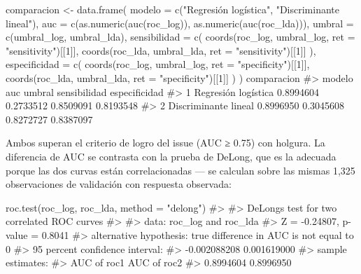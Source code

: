 \documentclass[
  spanish,
  letterpaper,
  DIV=11,
  numbers=noendperiod]{scrartcl}
\newenvironment{Shaded}{\begin{snugshade}}{\end{snugshade}}
\newcommand{\AttributeTok}[1]{\textcolor[rgb]{0.40,0.45,0.13}{#1}}
\newcommand{\CommentTok}[1]{\textcolor[rgb]{0.37,0.37,0.37}{#1}}
\newcommand{\DecValTok}[1]{\textcolor[rgb]{0.68,0.00,0.00}{#1}}
\newcommand{\FunctionTok}[1]{\textcolor[rgb]{0.28,0.35,0.67}{#1}}
\newcommand{\NormalTok}[1]{\textcolor[rgb]{0.00,0.23,0.31}{#1}}
\newcommand{\OtherTok}[1]{\textcolor[rgb]{0.00,0.23,0.31}{#1}}
\newcommand{\StringTok}[1]{\textcolor[rgb]{0.13,0.47,0.30}{#1}}
\begin{document}
\begin{Shaded}
\begin{Highlighting}[]
\NormalTok{comparacion }\OtherTok{\textless{}{-}} \FunctionTok{data.frame}\NormalTok{(}
    \AttributeTok{modelo =} \FunctionTok{c}\NormalTok{(}\StringTok{"Regresión logística"}\NormalTok{, }\StringTok{"Discriminante lineal"}\NormalTok{),}
    \AttributeTok{auc =} \FunctionTok{c}\NormalTok{(}\FunctionTok{as.numeric}\NormalTok{(}\FunctionTok{auc}\NormalTok{(roc\_log)), }\FunctionTok{as.numeric}\NormalTok{(}\FunctionTok{auc}\NormalTok{(roc\_lda))),}
    \AttributeTok{umbral =} \FunctionTok{c}\NormalTok{(umbral\_log, umbral\_lda),}
    \AttributeTok{sensibilidad =} \FunctionTok{c}\NormalTok{(}
        \FunctionTok{coords}\NormalTok{(roc\_log, umbral\_log, }\AttributeTok{ret =} \StringTok{"sensitivity"}\NormalTok{)[[}\DecValTok{1}\NormalTok{]],}
        \FunctionTok{coords}\NormalTok{(roc\_lda, umbral\_lda, }\AttributeTok{ret =} \StringTok{"sensitivity"}\NormalTok{)[[}\DecValTok{1}\NormalTok{]]}
\NormalTok{    ),}
    \AttributeTok{especificidad =} \FunctionTok{c}\NormalTok{(}
        \FunctionTok{coords}\NormalTok{(roc\_log, umbral\_log, }\AttributeTok{ret =} \StringTok{"specificity"}\NormalTok{)[[}\DecValTok{1}\NormalTok{]],}
        \FunctionTok{coords}\NormalTok{(roc\_lda, umbral\_lda, }\AttributeTok{ret =} \StringTok{"specificity"}\NormalTok{)[[}\DecValTok{1}\NormalTok{]]}
\NormalTok{    )}
\NormalTok{)}
\NormalTok{comparacion}
\CommentTok{\#\textgreater{}                 modelo       auc    umbral sensibilidad especificidad}
\CommentTok{\#\textgreater{} 1  Regresión logística 0.8994604 0.2733512    0.8509091     0.8193548}
\CommentTok{\#\textgreater{} 2 Discriminante lineal 0.8996950 0.3045608    0.8272727     0.8387097}
\end{Highlighting}
\end{Shaded}

Ambos superan el criterio de logro del issue (AUC ≥ 0.75) con holgura.
La diferencia de AUC se contrasta con la prueba de DeLong, que es la
adecuada porque las dos curvas están correlacionadas --- se calculan
sobre las mismas 1,325 observaciones de validación con respuesta
observada:

\begin{Shaded}
\begin{Highlighting}[]
\FunctionTok{roc.test}\NormalTok{(roc\_log, roc\_lda, }\AttributeTok{method =} \StringTok{"delong"}\NormalTok{)}
\CommentTok{\#\textgreater{} }
\CommentTok{\#\textgreater{}  DeLong\textquotesingle{}s test for two correlated ROC curves}
\CommentTok{\#\textgreater{} }
\CommentTok{\#\textgreater{} data:  roc\_log and roc\_lda}
\CommentTok{\#\textgreater{} Z = {-}0.24807, p{-}value = 0.8041}
\CommentTok{\#\textgreater{} alternative hypothesis: true difference in AUC is not equal to 0}
\CommentTok{\#\textgreater{} 95 percent confidence interval:}
\CommentTok{\#\textgreater{}  {-}0.002088208  0.001619000}
\CommentTok{\#\textgreater{} sample estimates:}
\CommentTok{\#\textgreater{} AUC of roc1 AUC of roc2 }
\CommentTok{\#\textgreater{}   0.8994604   0.8996950}
\end{Highlighting}
\end{Shaded}
\end{document}
